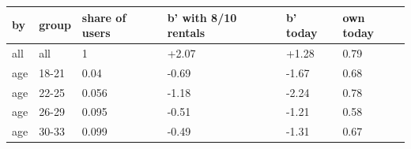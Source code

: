 \begingroup\small
\setlength{\tabcolsep}{3pt}
\renewcommand{\arraystretch}{1.04}
\begin{tabularx}{\linewidth}{XXXXXX}
\toprule
by & group & share of users & b' with 8/10 rentals & b' today & own today \\
\midrule
all & all & 1 & +2.07 & +1.28 & 0.79 \\
age & 18-21 & 0.04 & -0.69 & -1.67 & 0.68 \\
age & 22-25 & 0.056 & -1.18 & -2.24 & 0.78 \\
age & 26-29 & 0.095 & -0.51 & -1.21 & 0.58 \\
age & 30-33 & 0.099 & -0.49 & -1.31 & 0.67 \\
\bottomrule
\end{tabularx}
\endgroup
